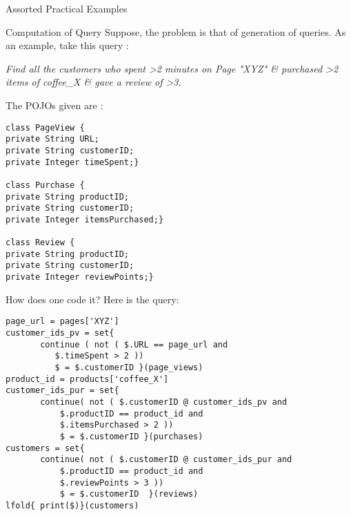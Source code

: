 \begin{section}{Assorted Practical Examples}
\begin{subsection}{Computation of Query}
Suppose, the problem is that of generation of queries.
As an example, take this query :

\emph{
Find all the customers who spent >2 minutes on Page "XYZ" 
\& purchased  >2 items of coffee\_X \& gave a review of >3. 
}

The POJOs given are :

\begin{center}\begin{minipage}{\linewidth}
\begin{lstlisting}[style=myJavaStyle]
class PageView { 
private String URL; 
private String customerID; 
private Integer timeSpent;} 

class Purchase { 
private String productID; 
private String customerID; 
private Integer itemsPurchased;} 

class Review { 
private String productID; 
private String customerID; 
private Integer reviewPoints;}
\end{lstlisting}  
\end{minipage}\end{center}

How does one code it? Here is the query:

\begin{center}\begin{minipage}{\linewidth}
\begin{lstlisting}[style=JexlStyle]
page_url = pages['XYZ']
customer_ids_pv = set{ 
       continue ( not ( $.URL == page_url and 
          $.timeSpent > 2 ))
          $ = $.customerID }(page_views)
product_id = products['coffee_X']
customer_ids_pur = set{ 
       continue( not ( $.customerID @ customer_ids_pv and  
           $.productID == product_id and 
           $.itemsPurchased > 2 )) 
           $ = $.customerID }(purchases)
customers = set{ 
       continue( not ( $.customerID @ customer_ids_pur and   
           $.productID == product_id and 
           $.reviewPoints > 3 )) 
           $ = $.customerID  }(reviews)
lfold{ print($)}(customers)
\end{lstlisting}  
\end{minipage}\end{center}

\end{subsection}


\end{section}


